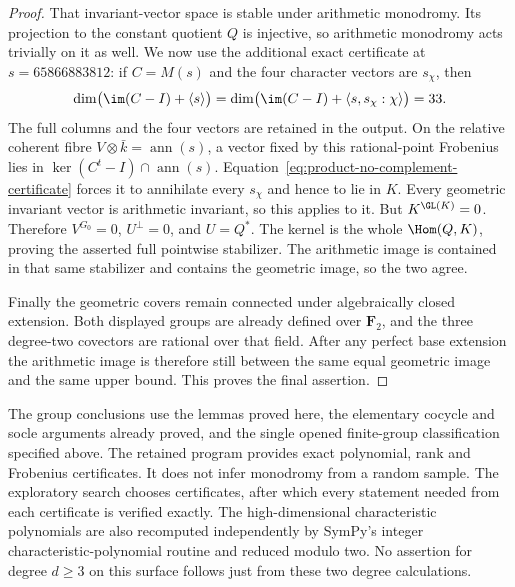 \begin{proof}
That invariant-vector space is stable under arithmetic monodromy.
Its projection to the constant quotient $Q$ is injective, so
arithmetic monodromy acts trivially on it as well.
We now use the additional exact certificate at $s=65866883812$:
if $C=M(s)$ and the four character vectors are $s_\chi$, then
\begin{equation}\label{eq:product-no-complement-certificate}
 \dim\bigl(\im(C-I)+\langle s\rangle\bigr)
 =\dim\bigl(\im(C-I)+\langle s,s_\chi:\chi\rangle\bigr)=33.
\end{equation}
The full columns and the four vectors are retained in the output.
On the relative coherent fibre $V\otimes\bar k=\operatorname{ann}(s)$,
a vector fixed by this rational-point Frobenius lies in
$\ker(C^t-I)\cap\operatorname{ann}(s)$.
Equation~\eqref{eq:product-no-complement-certificate} forces it
to annihilate every $s_\chi$ and hence to lie in $K$.
Every geometric invariant vector is arithmetic invariant, so this
applies to it.  But $K^{\GL(K)}=0$.  Therefore $V^{G_0}=0$,
$U^\perp=0$, and $U=Q^*$.
The kernel is the whole $\Hom(Q,K)$, proving the asserted full
pointwise stabilizer.  The arithmetic image is contained in that
same stabilizer and contains the geometric image, so the two agree.

Finally the geometric covers remain connected under algebraically
closed extension.  Both displayed groups are already defined over
$\mathbf F_2$, and the three degree-two covectors are rational
over that field.  After any perfect base extension the arithmetic
image is therefore still between the same equal geometric image
and the same upper bound.  This proves the final assertion.
\end{proof}

\begin{remark}\label{auto:A_monodromy:9178c750cd75}

The group conclusions use the lemmas proved here, the elementary
cocycle and socle arguments already proved, and the single opened
finite-group classification specified above.  The retained program
provides exact polynomial, rank and Frobenius certificates.  It does
not infer monodromy from a random sample.  The exploratory search
chooses certificates, after which every statement needed from each
certificate is verified exactly.  The high-dimensional characteristic
polynomials are also recomputed independently by SymPy's integer
characteristic-polynomial routine and reduced modulo two.
No assertion for degree $d\ge3$ on this surface follows just from
these two degree calculations.
\end{remark}


